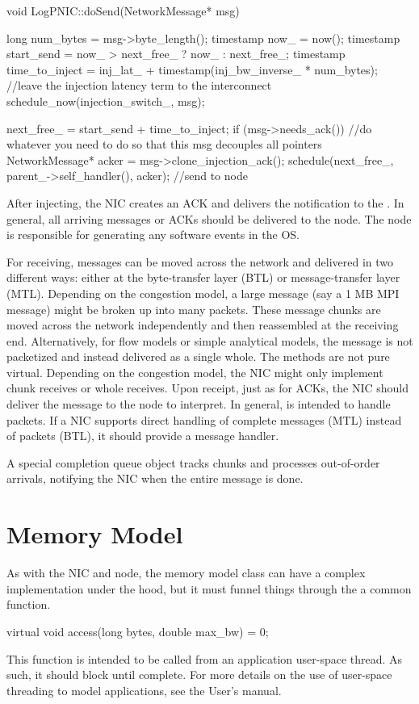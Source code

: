 \begin{CppCode}
void LogPNIC::doSend(NetworkMessage* msg)
{
  long num_bytes = msg->byte_length();
  timestamp now_ = now();
  timestamp start_send = now_ > next_free_ ? now_ : next_free_;
  timestamp time_to_inject = inj_lat_ + timestamp(inj_bw_inverse_ * num_bytes);
  //leave the injection latency term to the interconnect
  schedule_now(injection_switch_, msg);

  next_free_ = start_send + time_to_inject;
  if (msg->needs_ack()) {
    //do whatever you need to do so that this msg decouples all pointers
    NetworkMessage* acker = msg->clone_injection_ack();
    schedule(next_free_, parent_->self_handler(), acker); //send to node
  }
}
\end{CppCode}
After injecting, the NIC creates an ACK and delivers the notification to the \nodecls.
In general, all arriving messages or ACKs should be delivered to the node.
The node is responsible for generating any software events in the OS.

For receiving, messages can be moved across the network and delivered in two different ways:
either at the byte-transfer layer (BTL) or message-transfer layer (MTL).
Depending on the congestion model, a large message (say a 1 MB MPI message) might be broken up into many packets.
These message chunks are moved across the network independently and then reassembled at the receiving end.
Alternatively, for flow models or simple analytical models, the message is not packetized and instead delivered as a single whole.
The methods are not pure virtual.  Depending on the congestion model,  the NIC might only implement chunk receives or whole receives.
Upon receipt, just as for ACKs, the NIC should deliver the message to the node to interpret.
In general,  is intended to handle packets. 
If a NIC supports direct handling of complete messages (MTL) instead of packets (BTL),
it should provide a message handler.

A special completion queue object tracks chunks and processes out-of-order arrivals,
notifying the NIC when the entire message is done.

\section{Memory Model}\label{sec:memModel}
As with the NIC and node, the memory model class can have a complex implementation under the hood,
but it must funnel things through the a common function.

\begin{CppCode}
virtual void access(long bytes, double max_bw) = 0;
\end{CppCode}

This function is intended to be called from an application user-space thread.
As such, it should block until complete.
For more details on the use of user-space threading to model applications,
see the User's manual.





